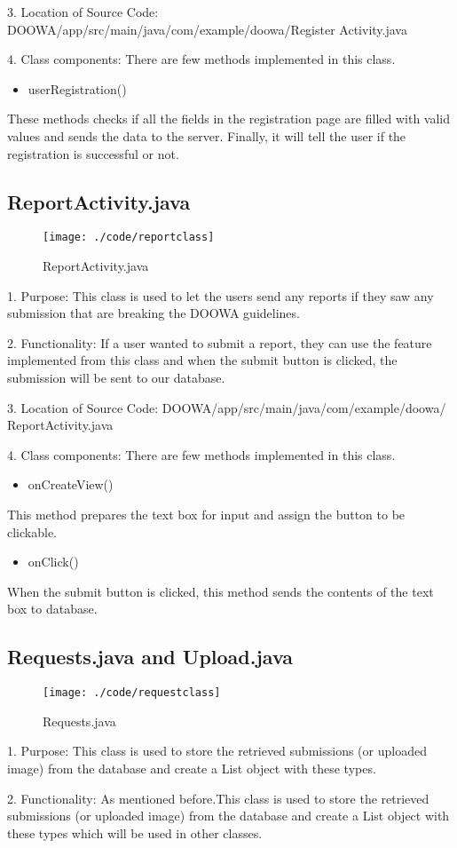 \documentclass[conference]{IEEEtran}
\begin{document}
3. Location of Source Code: DOOWA/app/src/main/java/com/example/doowa/Register Activity.java\break

4. Class components: There are few methods implemented in this class.
\begin{itemize}
\item userRegistration()
\end{itemize}
These methods checks if all the fields in the registration page are filled with valid values and sends the data to the server. Finally, it will tell the user if the registration is successful or not.
\break
\subsection{ReportActivity.java}
\begin{figure}[h!]
\texttt{[image: ./code/reportclass]}
\centering
\caption{ReportActivity.java}
\end{figure}
1. Purpose: This class is used to let the users send any reports if they saw any submission that are breaking the DOOWA guidelines.\break
\par 2. Functionality: If a user wanted to submit a report, they can use the feature implemented from this class and when the submit button is clicked, the submission will be sent to our database.\break

3. Location of Source Code: DOOWA/app/src/main/java/com/example/doowa/ ReportActivity.java\break

4. Class components: There are few methods implemented in this class.
\begin{itemize}
\item onCreateView()
\end{itemize}
This method prepares the text box for input and assign the button to be clickable.
\begin{itemize}
\item onClick()
\end{itemize}
When the submit button is clicked, this method sends the contents of the text box to database.
\break
\subsection{Requests.java and Upload.java}
\begin{figure}[h!]
\texttt{[image: ./code/requestclass]}
\centering
\caption{Requests.java}
\end{figure}
1. Purpose: This class is used to store the retrieved submissions (or uploaded image) from the database and create a List object with these types.\break
\par 2. Functionality: As mentioned before.This class is used to store the retrieved submissions (or uploaded image) from the database and create a List object with these types which will be used in other classes.\break
\end{document}
